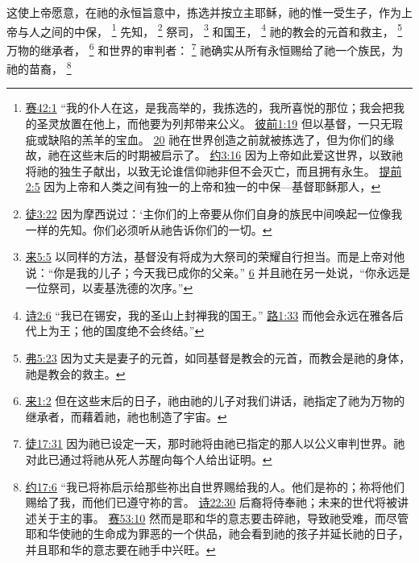 \documentclass[12pt, a4paper, oneside]{ctexart}
\newcounter{parnum}[section]
\newcommand{\N}{%
   \noindent\refstepcounter{parnum}%
    \makebox[\parindent][l]{\textbf{\arabic{parnum}.}}}
\begin{document}
\N 这使上帝愿意，在祂的永恒旨意中，拣选并按立主耶稣，祂的惟一受生子，作为上帝与人之间的中保，
	\footnote {
		\href{https://biblehub.com/isaiah/42-1.htm}{赛42:1} “我的仆人在这，是我高举的，我拣选的，我所喜悦的那位；我会把我的圣灵放置在他上，而他要为列邦带来公义。
		\href{https://biblehub.com/1_peter/1-19.htm}{彼前1:19} 但以基督，一只无瑕疵或缺陷的羔羊的宝血。
		\href{https://biblehub.com/1_peter/1-20.htm}{20} 祂在世界创造之前就被拣选了，但为你们的缘故，祂在这些末后的时期被启示了。
		\href{https://biblehub.com/john/3-16.htm}{约3:16} 因为上帝如此爱这世界，以致祂将祂的独生子献出，以致无论谁信仰祂非但不会灭亡，而且拥有永生。
		\href{https://biblehub.com/1_timothy/2-5.htm}{提前2:5} 因为上帝和人类之间有独一的上帝和独一的中保---基督耶稣那人，
	}
	先知，
	\footnote {
		\href{https://biblehub.com/acts/3-22.htm}{徒3:22} 因为摩西说过：‘主你们的上帝要从你们自身的族民中间唤起一位像我一样的先知。你们必须听从祂告诉你们的一切。
	}
	祭司，
	\footnote {
		\href{https://biblehub.com/hebrews/5-5.htm}{来5:5} 以同样的方法，基督没有将成为大祭司的荣耀自行担当。而是上帝对他说：“你是我的儿子；今天我已成你的父亲。”
		\href{https://biblehub.com/hebrews/5-6.htm}{6} 并且祂在另一处说，“你永远是一位祭司，以麦基洗德的次序。”
	}
	和国王，
	\footnote {
		\href{https://biblehub.com/psalms/2-6.htm}{诗2:6} “我已在锡安，我的圣山上封禅我的国王。”
		\href{https://biblehub.com/luke/1-33.htm}{路1:33} 而他会永远在雅各后代上为王；他的国度绝不会终结。”
	}
	祂的教会的元首和救主，
	\footnote {
		\href{https://biblehub.com/ephesians/5-23.htm}{弗5:23} 因为丈夫是妻子的元首，如同基督是教会的元首，而教会是祂的身体，祂是教会的救主。
	}
	万物的继承者，
	\footnote {
		\href{https://biblehub.com/hebrews/1-2.htm}{来1:2} 但在这些末后的日子，祂由祂的儿子对我们讲话，祂指定了祂为万物的继承者，而藉着祂，祂也制造了宇宙。
	}
	和世界的审判者：
	\footnote {
		\href{https://biblehub.com/acts/17-31.htm}{徒17:31} 因为祂已设定一天，那时祂将由祂已指定的那人以公义审判世界。祂对此已通过将祂从死人苏醒向每个人给出证明。
	}
	祂确实从所有永恒赐给了祂一个族民，为祂的苗裔，
	\footnote {
		\href{https://biblehub.com/john/17-6.htm}{约17:6} “我已将祢启示给那些祢出自世界赐给我的人。他们是祢的；祢将他们赐给了我，而他们已遵守祢的言。
		\href{https://biblehub.com/psalms/22-30.htm}{诗22:30} 后裔将侍奉祂；未来的世代将被讲述关于主的事。
		\href{https://biblehub.com/isaiah/53-10.htm}{赛53:10} 然而是耶和华的意志要击碎祂，导致祂受难，而尽管耶和华使祂的生命成为罪恶的一个供品，祂会看到祂的孩子并延长祂的日子，并且耶和华的意志要在祂手中兴旺。
	}
\end{document}
